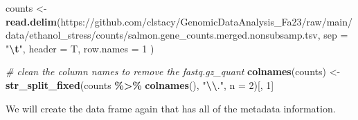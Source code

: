 \documentclass[
]{book}
\newenvironment{Shaded}{\begin{snugshade}}{\end{snugshade}}
\newcommand{\AttributeTok}[1]{\textcolor[rgb]{0.13,0.29,0.53}{#1}}
\newcommand{\CommentTok}[1]{\textcolor[rgb]{0.56,0.35,0.01}{\textit{#1}}}
\newcommand{\DecValTok}[1]{\textcolor[rgb]{0.00,0.00,0.81}{#1}}
\newcommand{\FunctionTok}[1]{\textcolor[rgb]{0.13,0.29,0.53}{\textbf{#1}}}
\newcommand{\NormalTok}[1]{#1}
\newcommand{\OtherTok}[1]{\textcolor[rgb]{0.56,0.35,0.01}{#1}}
\newcommand{\SpecialCharTok}[1]{\textcolor[rgb]{0.81,0.36,0.00}{\textbf{#1}}}
\newcommand{\StringTok}[1]{\textcolor[rgb]{0.31,0.60,0.02}{#1}}
\begin{document}
\begin{Shaded}
\begin{Highlighting}[]
\NormalTok{counts }\OtherTok{\textless{}{-}} \FunctionTok{read.delim}\NormalTok{(}\StringTok{\textquotesingle{}https://github.com/clstacy/GenomicDataAnalysis\_Fa23/raw/main/data/ethanol\_stress/counts/salmon.gene\_counts.merged.nonsubsamp.tsv\textquotesingle{}}\NormalTok{,}
    \AttributeTok{sep =} \StringTok{"}\SpecialCharTok{\textbackslash{}t}\StringTok{"}\NormalTok{,}
    \AttributeTok{header =}\NormalTok{ T,}
    \AttributeTok{row.names =} \DecValTok{1}
\NormalTok{  )}

\CommentTok{\# clean the column names to remove the fastq.gz\_quant}
\FunctionTok{colnames}\NormalTok{(counts) }\OtherTok{\textless{}{-}} \FunctionTok{str\_split\_fixed}\NormalTok{(counts }\SpecialCharTok{\%\textgreater{}\%} \FunctionTok{colnames}\NormalTok{(), }\StringTok{"}\SpecialCharTok{\textbackslash{}\textbackslash{}}\StringTok{."}\NormalTok{, }\AttributeTok{n =} \DecValTok{2}\NormalTok{)[, }\DecValTok{1}\NormalTok{]}
\end{Highlighting}
\end{Shaded}

We will create the data frame again that has all of the metadata information.
\end{document}
